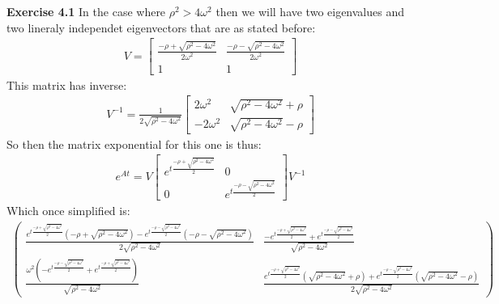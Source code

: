 \documentclass[12pt]{article}
\newenvironment{exercise}[1]{\vspace{.1in}\noindent\textbf{Exercise #1 \hspace{.05em}}}{}
\theoremstyle{definition}
\theoremstyle{remark}
\begin{document}
\begin{exercise}{4.1}
	In the case where $\rho^2>4\omega^2$ then we will have two eigenvalues and two lineraly independet eigenvectors that are as stated before:
	\begin{align}
		V=\begin{bmatrix}
			  \frac{-\rho+\sqrt{\rho^2-4\omega^2}}{2\omega^2} & \frac{-\rho-\sqrt{\rho^2-4\omega^2}}{2\omega^2} \\
			  1                                               & 1
		  \end{bmatrix}
	\end{align}
	This matrix has inverse:
	\begin{align}
		V^{-1}=\frac{1}{2\sqrt{\rho^2-4\omega^2}}
		\begin{bmatrix}
			2\omega^2  & \sqrt{\rho^2-4\omega^2}+\rho  \\
			-2\omega^2 & \sqrt{\rho^2-4\omega^2} -\rho
		\end{bmatrix}
	\end{align}
	So then the matrix exponential for this one is thus:
	\begin{align}
		e^{At}=V %
		\begin{bmatrix}
			e^{t\frac{-\rho + \sqrt{\rho^2-4\omega^2}}{2}
			} & 0                                             \\
			0 & e^{t\frac{-\rho - \sqrt{\rho^2-4\omega^2}}{2}
				}
		\end{bmatrix}V^{-1}
	\end{align}
	Which once simplified is:
	\begin{align}
		\begin{pmatrix}\frac{e^{t\frac{-\rho+\sqrt{\rho^2-4\omega^2}}{2}}\left(-\rho+\sqrt{\rho^2-4\omega^2}\right)-e^{t\frac{-\rho-\sqrt{\rho^2-4\omega^2}}{2}}\left(-\rho-\sqrt{\rho^2-4\omega^2}\right)}{2\sqrt{\rho^2-4\omega^2}} & \frac{-e^{t\frac{-\rho+\sqrt{\rho^2-4\omega^2}}{2}}+e^{t\frac{-\rho-\sqrt{\rho^2-4\omega^2}}{2}}}{\sqrt{\rho^2-4\omega^2}}                                                                                   \\
               \frac{\omega^2\left(-e^{t\frac{-\rho-\sqrt{\rho^2-4\omega^2}}{2}}+e^{t\frac{-\rho+\sqrt{\rho^2-4\omega^2}}{2}}\right)}{\sqrt{\rho^2-4\omega^2}}                                                                & \frac{e^{t\frac{-\rho+\sqrt{\rho^2-4\omega^2}}{2}}\left(\sqrt{\rho^2-4\omega^2}+\rho\right)+e^{t\frac{-\rho-\sqrt{\rho^2-4\omega^2}}{2}}\left(\sqrt{\rho^2-4\omega^2}-\rho\right)}{2\sqrt{\rho^2-4\omega^2}}\end{pmatrix}
	\end{align}


\end{exercise}
\end{document}
